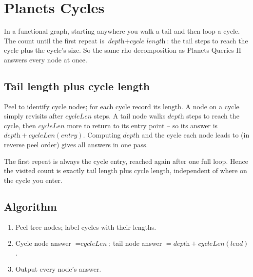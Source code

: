 \section{Planets Cycles}
\label{sec:cses-planets-cycles}


\begin{patternbox}
In a functional graph, starting anywhere you walk a tail and then loop a
cycle. The count until the first repeat is $\textit{depth}+\textit{cycle
length}$: the tail steps to reach the cycle plus the cycle's size. So the
same rho decomposition as Planets Queries II answers every node at once.
\end{patternbox}

\subsection*{Tail length plus cycle length}

Peel to identify cycle nodes; for each cycle record its length. A node on a
cycle simply revisits after $\textit{cycleLen}$ steps. A tail node walks
$\textit{depth}$ steps to reach the cycle, then $\textit{cycleLen}$ more to
return to its entry point -- so its answer is
$\textit{depth}+\textit{cycleLen}(\textit{entry})$. Computing $\textit{depth}$
and the cycle each node leads to (in reverse peel order) gives all answers in
one pass.

\begin{ideabox}
The first repeat is always the cycle entry, reached again after one full
loop. Hence the visited count is exactly tail length plus cycle length,
independent of where on the cycle you enter.
\end{ideabox}

\subsection*{Algorithm}

\begin{enumerate}
  \item Peel tree nodes; label cycles with their lengths.
  \item Cycle node answer $=\textit{cycleLen}$; tail node answer
        $=\textit{depth}+\textit{cycleLen}(\textit{lead})$.
  \item Output every node's answer.
\end{enumerate}

